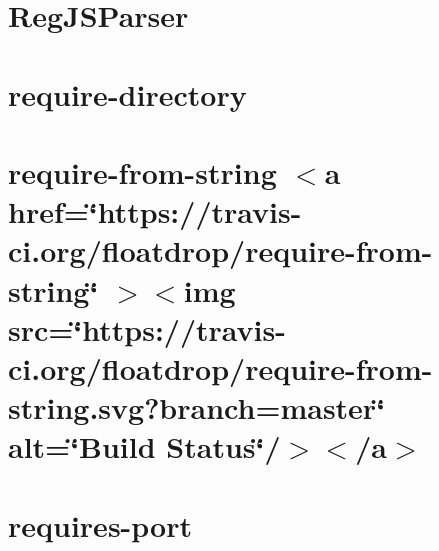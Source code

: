 \documentclass[twoside]{book}
\newcommand{\+}{\discretionary{\mbox{\scriptsize$\hookleftarrow$}}{}{}}
\begin{document}
\chapter{Reg\+JSParser}
\label{md__c___users_vaishnavi_jadhav__desktop__developer_code_mean_stack_example_client_node_modules_regjsparser__r_e_a_d_m_e}

\chapter{require-\/directory}
\label{md__c___users_vaishnavi_jadhav__desktop__developer_code_mean_stack_example_client_node_modules_require_directory__r_e_a_d_m_e}

\chapter{require-\/from-\/string \texorpdfstring{$<$}{<}a href=\char`\"{}https\+://travis-\/ci.\+org/floatdrop/require-\/from-\/string\char`\"{} \texorpdfstring{$>$}{>}\texorpdfstring{$<$}{<}img src=\char`\"{}https\+://travis-\/ci.\+org/floatdrop/require-\/from-\/string.\+svg?branch=master\char`\"{} alt=\char`\"{}\+Build Status\char`\"{}/\texorpdfstring{$>$}{>}\texorpdfstring{$<$}{<}/a\texorpdfstring{$>$}{>}}
\label{md__c___users_vaishnavi_jadhav__desktop__developer_code_mean_stack_example_client_node_modules_require_from_string_readme}

\chapter{requires-\/port}
\label{md__c___users_vaishnavi_jadhav__desktop__developer_code_mean_stack_example_client_node_modules_requires_port__r_e_a_d_m_e}

\end{document}

